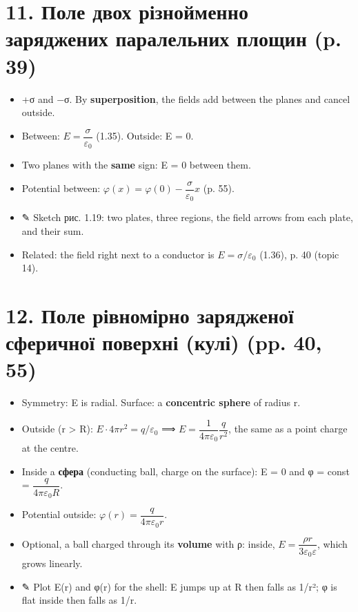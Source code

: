 \documentclass[11pt,a4paper,oneside]{book}
\newcommand{\pen}{{\sffamily\color{accent}✎}}
\begin{document}
\section*{11. Поле двох різнойменно заряджених паралельних площин (p. 39)}
\begin{itemize}
\item +σ and −σ. By \textbf{superposition}, the fields add between the planes and cancel outside.
\item Between: $E = \dfrac{\sigma}{\varepsilon_0}$ (1.35). Outside: E = 0.
\item Two planes with the \textbf{same} sign: E = 0 between them.
\item Potential between: $\varphi(x) = \varphi(0) - \dfrac{\sigma}{\varepsilon_0}x$ (p. 55).
\item \pen{} Sketch рис. 1.19: two plates, three regions, the field arrows from each plate, and their sum.
\item Related: the field right next to a conductor is $E = \sigma/\varepsilon_0$ (1.36), p. 40 (topic 14).
\end{itemize}

\section*{12. Поле рівномірно зарядженої сферичної поверхні (кулі) (pp. 40, 55)}
\begin{itemize}
\item Symmetry: E is radial. Surface: a \textbf{concentric sphere} of radius r.
\item Outside (r > R): $E\cdot4\pi r^2 = q/\varepsilon_0$ ⟹ $E = \dfrac{1}{4\pi\varepsilon_0}\dfrac{q}{r^2}$, the same as a point charge at the centre.
\item Inside a \textbf{сфера} (conducting ball, charge on the surface): E = 0 and φ = const = $\dfrac{q}{4\pi\varepsilon_0R}$.
\item Potential outside: $\varphi(r) = \dfrac{q}{4\pi\varepsilon_0 r}$.
\item Optional, a ball charged through its \textbf{volume} with ρ: inside, $E = \dfrac{\rho r}{3\varepsilon_0\varepsilon}$, which grows linearly.
\item \pen{} Plot E(r) and φ(r) for the shell: E jumps up at R then falls as 1/r²; φ is flat inside then falls as 1/r.
\end{itemize}
\end{document}
